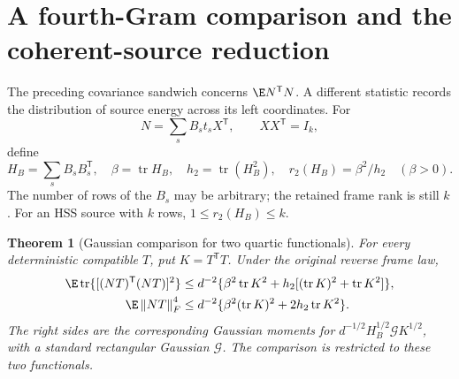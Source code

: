 \documentclass[11pt,oneside,openany,a4paper]{book}
\numberwithin{equation}{chapter}
\newtheorem{theorem}{Theorem}[chapter]
\theoremstyle{definition}
\theoremstyle{remark}
\newcommand{\T}{\mathsf T}\newcommand{\Id}{I}
\newcommand{\F}[1]{\left\lVert#1\right\rVert_F}
\DeclareMathOperator{\tr}{tr}\DeclareMathOperator{\rank}{rank}
\begin{document}
\section{A fourth-Gram comparison and the coherent-source reduction}\label{base:con:gram}
The preceding covariance sandwich concerns $\E N^\T N$. A different statistic records the distribution of source energy across its left coordinates. For
\[
 N=\sum_s B_st_sX^\T,\qquad XX^\T=I_k,
\]
define
\[
 H_B=\sum_sB_sB_s^\T,\quad \beta=\tr H_B,
 \quad h_2=\tr(H_B^2),\quad r_2(H_B)=\beta^2/h_2\quad(\beta>0).
\]
The number of rows of the $B_s$ may be arbitrary; the retained frame rank is still $k$. For an HSS source with $k$ rows, $1\le r_2(H_B)\le k$.

\begin{theorem}[Gaussian comparison for two quartic functionals]\label{base:con:gram-thm}
For every deterministic compatible $T$, put $K=T^\T T$. Under the original reverse frame law,
\begin{align}
 \E\tr\{[(NT)^\T(NT)]^2\}
 &\le d^{-2}\{\beta^2\tr K^2+h_2[(\tr K)^2+\tr K^2]\},\label{base:con:gram-fourth}\\
 \E\F{NT}^4&\le d^{-2}\{\beta^2(\tr K)^2+2h_2\tr K^2\}.\label{base:con:frob-fourth}
\end{align}
The right sides are the corresponding Gaussian moments for
$d^{-1/2}H_B^{1/2}\mathcal G K^{1/2}$, with a standard rectangular Gaussian $\mathcal G$. The comparison is restricted to these two functionals.
\end{theorem}
\end{document}

